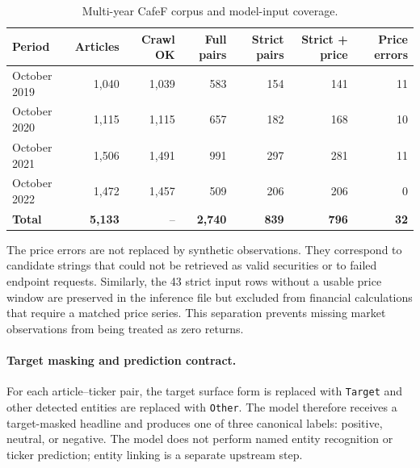 \begin{table}[htbp]
\centering
\small
\caption{Multi-year CafeF corpus and model-input coverage.}
\label{tab:multi-year-news-coverage}
\begin{tabular}{lrrrrrr}
\toprule
\textbf{Period} & \textbf{Articles} & \textbf{Crawl OK} & \textbf{Full pairs} & \textbf{Strict pairs} & \textbf{Strict + price} & \textbf{Price errors} \\
\midrule
October 2019 & 1,040 & 1,039 & 583 & 154 & 141 & 11 \\
October 2020 & 1,115 & 1,115 & 657 & 182 & 168 & 10 \\
October 2021 & 1,506 & 1,491 & 991 & 297 & 281 & 11 \\
October 2022 & 1,472 & 1,457 & 509 & 206 & 206 & 0 \\
\midrule
\textbf{Total} & \textbf{5,133} & -- & \textbf{2,740} & \textbf{839} & \textbf{796} & \textbf{32} \\
\bottomrule
\end{tabular}
\end{table}

The price errors are not replaced by synthetic observations. They correspond to candidate strings that could not be retrieved as valid securities or to failed endpoint requests. Similarly, the 43 strict input rows without a usable price window are preserved in the inference file but excluded from financial calculations that require a matched price series. This separation prevents missing market observations from being treated as zero returns.

\paragraph{Target masking and prediction contract.}
For each article--ticker pair, the target surface form is replaced with \texttt{Target} and other detected entities are replaced with \texttt{Other}. The model therefore receives a target-masked headline and produces one of three canonical labels: positive, neutral, or negative. The model does not perform named entity recognition or ticker prediction; entity linking is a separate upstream step.

